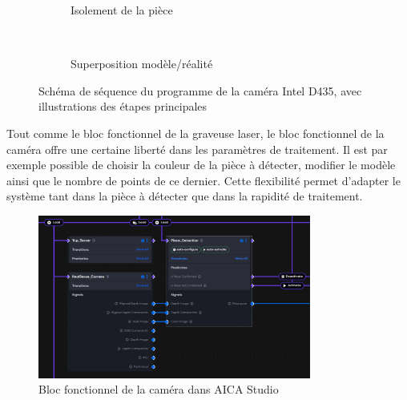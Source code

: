 \begin{figure}[H]
\begin{minipage}{0.4\textwidth}
\begin{subfigure}{0.8\linewidth}
            \caption{Isolement de la pièce}
        \end{subfigure}\\[0.2cm]
        \begin{subfigure}{0.8\linewidth}
            \caption{Superposition modèle/réalité}
        \end{subfigure}
    \end{minipage}
    \caption{Schéma de séquence du programme de la caméra Intel D435, avec illustrations des étapes principales}
    \label{fig:sequence_camera_illustre}
\end{figure}

Tout comme le bloc fonctionnel de la graveuse laser, le bloc fonctionnel de la caméra offre une certaine liberté dans les paramètres de traitement. Il est par exemple possible de choisir la couleur de la pièce à détecter, modifier le modèle ainsi que le nombre de points de ce dernier. Cette flexibilité permet d'adapter le système tant dans la pièce à détecter que dans la rapidité de traitement.

\begin{figure}[H]
    \centering
    \includegraphics[width=0.8\textwidth]{assets/figures/AICA_Camera.png}
    \caption{Bloc fonctionnel de la caméra dans AICA Studio}
    \label{fig:camera_interface}
\end{figure}

